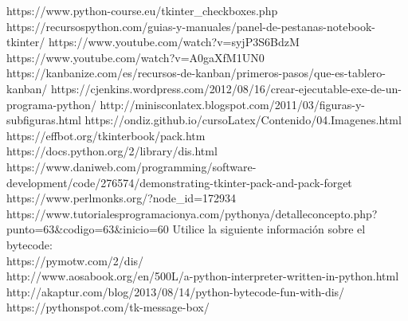 

https://www.python-course.eu/tkinter_checkboxes.php
https://recursospython.com/guias-y-manuales/panel-de-pestanas-notebook-tkinter/
https://www.youtube.com/watch?v=syjP3S6BdzM
https://www.youtube.com/watch?v=A0gaXfM1UN0
https://kanbanize.com/es/recursos-de-kanban/primeros-pasos/que-es-tablero-kanban/
https://cjenkins.wordpress.com/2012/08/16/crear-ejecutable-exe-de-un-programa-python/
http://minisconlatex.blogspot.com/2011/03/figuras-y-subfiguras.html
https://ondiz.github.io/cursoLatex/Contenido/04.Imagenes.html
https://effbot.org/tkinterbook/pack.htm
https://docs.python.org/2/library/dis.html
https://www.daniweb.com/programming/software-development/code/276574/demonstrating-tkinter-pack-and-pack-forget
https://www.perlmonks.org/?node_id=172934
https://www.tutorialesprogramacionya.com/pythonya/detalleconcepto.php?punto=63&codigo=63&inicio=60
Utilice la siguiente información sobre el bytecode:\\
https://pymotw.com/2/dis/\\
http://www.aosabook.org/en/500L/a-python-interpreter-written-in-python.html\\
http://akaptur.com/blog/2013/08/14/python-bytecode-fun-with-dis/\\
https://pythonspot.com/tk-message-box/\\